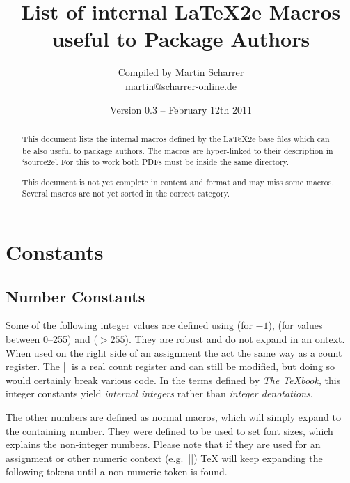 \documentclass[12pt,a4paper]{article}
\title{List of internal \LaTeX2e Macros useful to Package Authors}
\author{Compiled by Martin Scharrer\\\url{martin@scharrer-online.de}}
\date{Version 0.3 -- February 12th 2011}
\begin{document}
\maketitle
\begin{abstract}
This document lists the internal macros defined by the \LaTeX2e base files which can be also useful
to package authors.  The macros are hyper-linked to their description in `source2e'.
For this to work both PDFs must be inside the same directory.

This document is not yet complete in content and format and may miss some macros. Several macros are
not yet sorted in the correct category.
\end{abstract}


\tableofcontents

\clearpage

\section{Constants}

\subsection{Number Constants}

Some of the following integer values are defined using \Macro\countdef\relax (for $-1$),
\Macro\chardef\relax (for values between 0--255) and \Macro\mathchardef\relax ($>255$).  They are
robust and do not expand in an \Macro\edef\relax context. When used on the right side of an
assignment the act the same way as a count register.  The |\m@ne| is a real count register and can
still be modified, but doing so would certainly break various code.  In the terms defined by
\emph{The TeXbook}, this integer constants yield \emph{internal integers} rather than \emph{integer
denotations}.

The other numbers are defined as normal macros, which will simply expand to the containing number.
They were defined
to be used to set font sizes, which explains the non-integer numbers.  Please note that if they
are used for an assignment or other numeric context (e.g.\ |\ifnum|) TeX will keep expanding the
following tokens until a non-numeric token is found.%
\end{document}

